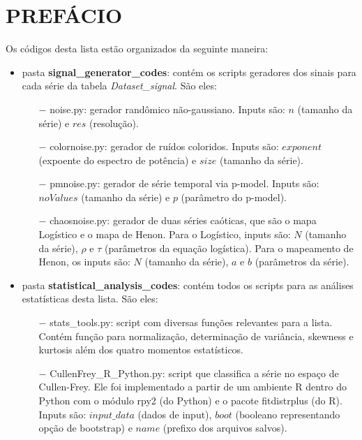 
\chapter*{\large PREFÁCIO}

Os códigos desta lista estão organizados da seguinte maneira:

\begin{itemize}

\item pasta \textbf{signal\_generator\_codes}: contém os scripts geradores dos sinais para cada série da tabela \textit{Dataset\_signal}. São eles:

\begin{itemize}
\item[$-$] noise.py: gerador randômico não-gaussiano. Inputs são: $n$ (tamanho da série) e $res$ (resolução).

\item[$-$] colornoise.py: gerador de ruídos coloridos. Inputs são: $exponent$ (expoente do espectro de potência) e $size$ (tamanho da série).

\item[$-$] pmnoise.py: gerador de série temporal via p-model. Inputs são: $noValues$ (tamanho da série) e $p$ (parâmetro do p-model).

\item[$-$] chaosnoise.py: gerador de duas séries caóticas, que são o mapa Logístico e o mapa de Henon. Para o Logístico, inputs são: $N$ (tamanho da série), $\rho$ e $\tau$ (parâmetros da equação logística). Para o mapeamento de Henon, os inputs são: $N$ (tamanho da série), $a$ e $b$ (parâmetros da série). 
\end{itemize}

\item pasta \textbf{statistical\_analysis\_codes}: contém todos os scripts para as análises estatísticas desta lista. São eles:

\begin{itemize}
\item[$-$] stats\_tools.py: script com diversas funções relevantes para a lista. Contém função para normalização, determinação de variância, skewness e kurtosis além dos quatro momentos estatísticos.

\item[$-$] CullenFrey\_R\_Python.py: script que classifica a série no espaço de Cullen-Frey. Ele foi implementado a partir de um ambiente R dentro do Python com o módulo rpy2 (do Python) e o pacote fitdistrplus (do R). Inputs são: $input\_data$ (dados de input), $boot$ (booleano representando opção de bootstrap) e $name$ (prefixo dos arquivos salvos).


\end{itemize}
\end{itemize}
